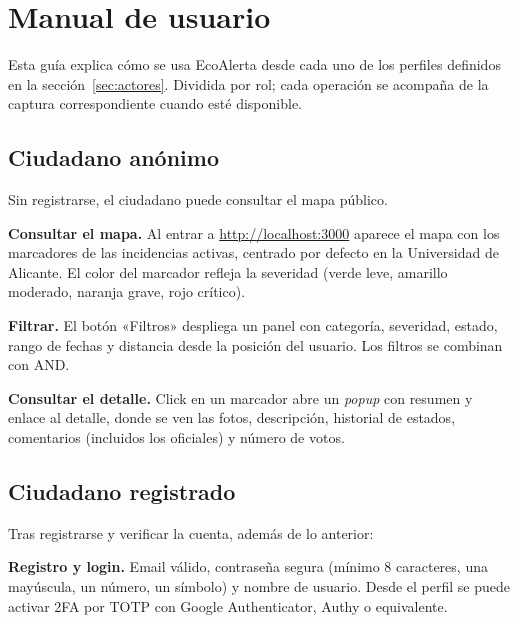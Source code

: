 \chapter{Manual de usuario}
\label{app:manual-usuario}

Esta guía explica cómo se usa EcoAlerta desde cada uno de los perfiles definidos en la sección~\ref{sec:actores}. Dividida por rol; cada operación se acompaña de la captura correspondiente cuando esté disponible.



\section{Ciudadano anónimo}
\label{sec:manual-anonimo}

Sin registrarse, el ciudadano puede consultar el mapa público.

\textbf{Consultar el mapa.}  Al entrar a \url{http://localhost:3000} aparece el mapa con los marcadores de las incidencias activas, centrado por defecto en la Universidad de Alicante. El color del marcador refleja la severidad (verde leve, amarillo moderado, naranja grave, rojo crítico).

\textbf{Filtrar.}  El botón «Filtros» despliega un panel con categoría, severidad, estado, rango de fechas y distancia desde la posición del usuario. Los filtros se combinan con AND.

\textbf{Consultar el detalle.}  Click en un marcador abre un \textit{popup} con resumen y enlace al detalle, donde se ven las fotos, descripción, historial de estados, comentarios (incluidos los oficiales) y número de votos.


\section{Ciudadano registrado}
\label{sec:manual-ciudadano}

Tras registrarse y verificar la cuenta, además de lo anterior:

\textbf{Registro y login.}  Email válido, contraseña segura (mínimo 8 caracteres, una mayúscula, un número, un símbolo) y nombre de usuario. Desde el perfil se puede activar 2FA por TOTP con Google Authenticator, Authy o equivalente.

